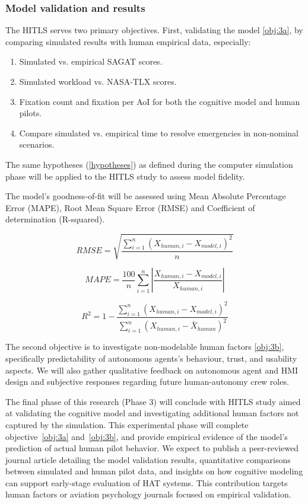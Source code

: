 \documentclass[12pt,a4paper]{article} %
\begin{document}
	\subsubsection{Model validation and results}
	The HITLS serves two primary objectives. First, validating the model \ref{obj:3a}, by comparing simulated results with human empirical data, especially:
	\begin{enumerate}
		\item Simulated vs. empirical SAGAT scores.
		\item Simulated workload vs. NASA-TLX scores.
		\item Fixation count and fixation per AoI for both the cognitive model and human pilots.
		\item Compare simulated vs. empirical time to resolve emergencies in non-nominal scenarios. 
	\end{enumerate}
	The same hypotheses (\ref{hypotheses}) as defined during the computer simulation phase will be applied to the HITLS study to assess model fidelity. 

	The model's goodness-of-fit will be assessed using Mean Absolute Percentage Error (MAPE), Root Mean Square Error (RMSE) and Coefficient of determination (R-squared).

	\begin{equation}
		RMSE = \sqrt{\frac{\sum_{i=1}^{n} \left(X_{human,i}-X_{model,i}\right)^2}{n} } 
	\end{equation}

	\begin{equation}
		MAPE = \frac{100}{n} \sum_{i=1}^{n} \left\lvert \frac{X_{human,i} - X_{model,i}}{X_{human,i}} \right\rvert 
	\end{equation}

	\begin{equation}
		R^2 = 1 - \frac{\sum_{i=1}^{n} (X_{human,i} - X_{model,i})^2}{\sum_{i=1}^{n} (X_{human,i} - \bar{X}_{human})^2}
	\end{equation}

	The second objective is to investigate non-modelable human factors \ref{obj:3b}, specifically predictability of autonomous agents's behaviour, trust, and usability aspects. We will also gather qualitative feedback on autonomous agent and HMI design and subjective responses regarding future human-autonomy crew roles.

	The final phase of this research (Phase 3) will conclude with HITLS study aimed at validating the cognitive model and investigating additional human factors not captured by the simulation. This experimental phase will complete objective~\ref{obj:3a} and~\ref{obj:3b}, and provide empirical evidence of the model's prediction of actual human pilot behavior. We expect to publish a peer-reviewed journal article detailing the model validation results, quantitative comparisons between simulated and human pilot data, and insights on how cognitive modeling can support early-stage evaluation of HAT systems. This contribution targets human factors or aviation psychology journals focused on empirical validation.
\end{document}
